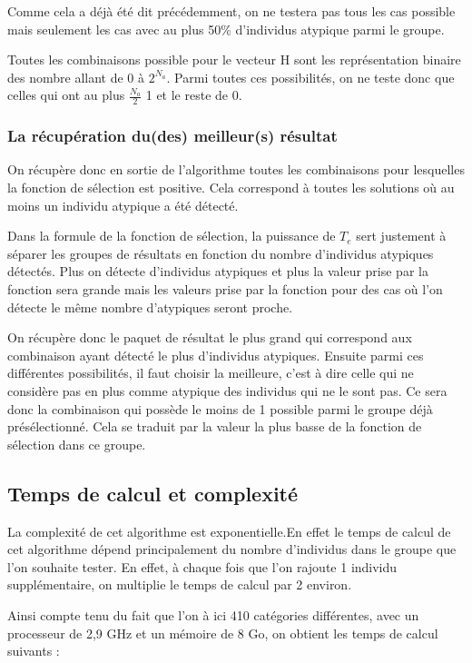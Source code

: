 \documentclass[a4paper, 11pt]{article}
\begin{document}
Comme cela a déjà été dit précédemment, on ne testera pas tous les cas possible mais seulement les cas avec au plus 50\% d'individus atypique parmi le groupe.

Toutes les combinaisons possible pour le vecteur H sont les représentation binaire des nombre allant de 0 à $2^{N_a}$. Parmi toutes ces possibilités, on ne teste donc que celles qui ont au plus $\frac{N_a}{2}$ 1 et le reste de 0.

\subsubsection{La récupération du(des) meilleur(s) résultat}

On récupère donc en sortie de l'algorithme toutes les combinaisons pour lesquelles la fonction de sélection est positive. Cela correspond à toutes les solutions où au moins un individu atypique a été détecté. 

Dans la formule de la fonction de sélection, la puissance de $T_e$ sert justement à séparer les groupes de résultats en fonction du nombre d'individus atypiques détectés. Plus on détecte d'individus atypiques et plus la valeur prise par la fonction sera grande mais les valeurs prise par la fonction pour des cas où l'on détecte le même nombre d'atypiques seront proche.

On récupère donc le paquet de résultat le plus grand qui correspond aux combinaison ayant détecté le plus d'individus atypiques. Ensuite parmi ces différentes possibilités, il faut choisir la meilleure, c'est à dire celle qui ne considère pas en plus comme atypique des individus qui ne le sont pas. Ce sera donc la combinaison qui possède le moins de 1 possible parmi le groupe déjà présélectionné. Cela se traduit par la valeur la plus basse de la fonction de sélection dans ce groupe.

\subsection{Temps de calcul et complexité}

La complexité de cet algorithme est exponentielle.En effet le temps de calcul de cet algorithme dépend principalement du nombre d'individus dans le groupe que l'on souhaite tester. En effet, à chaque fois que l'on rajoute 1 individu supplémentaire, on multiplie le temps de calcul par 2 environ.

Ainsi compte tenu du fait que l'on à ici 410 catégories différentes, avec un processeur de 2,9 GHz et un mémoire de 8 Go, on obtient les temps de calcul suivants :
\end{document}
